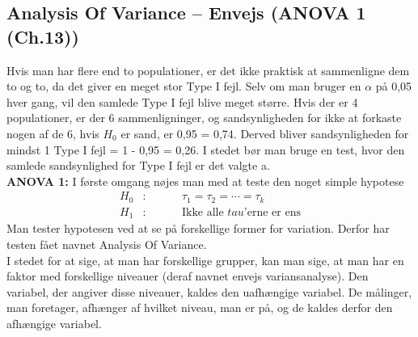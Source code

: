 \documentclass[11pt]{article}
\begin{document}
\subsection{Analysis Of Variance -- Envejs (ANOVA 1 (Ch.13))}
Hvis man har flere end to populationer, er det ikke praktisk at sammenligne dem to og to, da det giver en meget stor Type I fejl. Selv om man bruger en $\alpha$ på 0,05 hver gang, vil den samlede Type I fejl blive meget større. Hvis der er 4 populationer, er der 6 sammenligninger, og sandsynligheden for ikke at forkaste nogen af de 6, hvis $H_0$ er sand, er 0,95 = 0,74. Derved bliver sandsynligheden for mindst 1 Type I fejl = 1 - 0,95 = 0,26. I stedet bør man bruge en test, hvor den samlede sandsynlighed for Type I fejl er det valgte a.\\[0.2cm]
\textbf{ANOVA 1:} I første omgang nøjes man med at teste den noget simple hypotese
\begin{eqnarray*}
H_0&:&\hspace{1cm}\tau_1 = \tau_2 = \cdots =\tau_k\\
H_1&:&\hspace{1cm}\text{Ikke alle $tau$'erne er ens}
\end{eqnarray*}
Man tester hypotesen ved at se på forskellige former for variation. Derfor har testen fået navnet Analysis Of Variance.\\[0.2cm]
I stedet for at sige, at man har forskellige grupper, kan man sige, at man har en faktor med forskellige niveauer (deraf navnet envejs variansanalyse). Den variabel, der angiver disse niveauer, kaldes den uafhængige variabel. De målinger, man foretager, afhænger af hvilket niveau, man er på, og de kaldes derfor den afhængige variabel.
\end{document}
